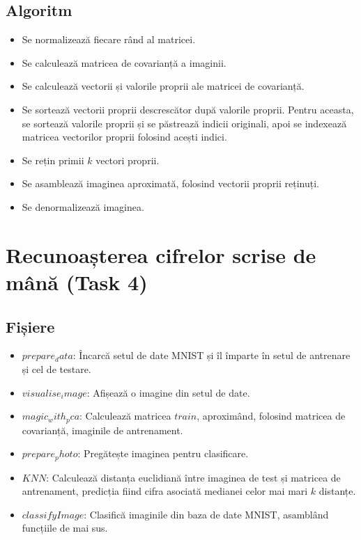 \documentclass{article}
\begin{document}
\subsection{Algoritm}
\begin{itemize}
      \item Se normalizează fiecare rând al matricei.
      \item Se calculează matricea de covarianță a imaginii.
      \item Se calculează vectorii și valorile proprii ale matricei de
            covarianță.
      \item Se sortează vectorii proprii descrescător după valorile proprii.
            Pentru aceasta, se sortează valorile proprii și se păstrează indicii
            originali, apoi se indexează matricea vectorilor proprii folosind
            acești indici.
      \item Se rețin primii $k$ vectori proprii.
      \item Se asamblează imaginea aproximată, folosind vectorii proprii
            reținuți.
      \item Se denormalizează imaginea.
\end{itemize}

\section{Recunoașterea cifrelor scrise de mână (Task 4)}

\subsection{Fișiere}
\begin{itemize}
      \item $prepare_data$: Încarcă setul de date MNIST și îl împarte în
            setul de antrenare și cel de testare.
      \item $visualise_image$: Afișează o imagine din setul de date.
      \item $magic_with_pca$: Calculează matricea $train$, aproximând, folosind
            matricea de covarianță, imaginile de antrenament.
      \item $prepare_photo$: Pregătește imaginea pentru clasificare.
      \item $KNN$: Calculează distanța euclidiană între imaginea de test și
            matricea de antrenament, predicția fiind cifra asociată medianei
            celor mai mari $k$ distanțe.
      \item $classifyImage$: Clasifică imaginile din baza de date MNIST,
            asamblând funcțiile de mai sus.
\end{itemize}
\end{document}
